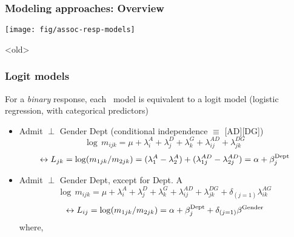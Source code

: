 \renewcommand{\FileName}{logit}
\begin{frame}
	\frametitle{Modeling approaches: Overview}
\begin{center}
\texttt{[image: fig/assoc-resp-models]}
\end{center}
\end{frame}

\begin{frame}<old>
\frametitle{Logit models}
For a \emph{binary} response, each \loglin\ model is equivalent to a logit
model (logistic regression, with categorical predictors)
  \begin{itemize}
	\item<1-> Admit $\perp$ Gender \given Dept (conditional independence $\equiv$ [AD][DG])
	\begin{equation*}
	  \log \,  m_{ijk}  =
	  \mu
	  +  \lambda_i^A
	  +  \lambda_j^D
	  +  \lambda_k^G
	  +  \lambda_{ij}^{AD}
	  +  \lambda_{jk}^{DG}
	\end{equation*}
	\begin{equation*}
	\leftrightarrow L_{jk} = \log (m_{1jk} / m_{2jk}) 
	= (\lambda_1^A - \lambda_2^A) + (\lambda_{1j}^{AD} - \lambda_{2j}^{AD})
	=\alpha   +  \beta _j^{\mbox{\scriptsize Dept}} 
	\end{equation*}

	\item<2-> Admit $\perp$ Gender \given Dept, except for Dept. A
	\begin{equation*}
	  \log \,  m_{ijk}  =
	  \mu
	  +  \lambda_i^A
	  +  \lambda_j^D
	  +  \lambda_k^G
	  +  \lambda_{ij}^{AD}
	  +  \lambda_{jk}^{DG}
	  +  \delta_{(j=1)} \lambda_{ik}^{AG}
	\end{equation*}
	\begin{equation*}
	\leftrightarrow  L_{ij}  = \log (m_{1jk} / m_{2jk}) = 
	   \alpha   +  \beta _j^{\mbox{\scriptsize Dept}}
	   +  \delta_{(j=1)} \beta^{\mbox{\scriptsize Gender}}
	\end{equation*}
	   where,
  \end{itemize} 
\end{frame}

